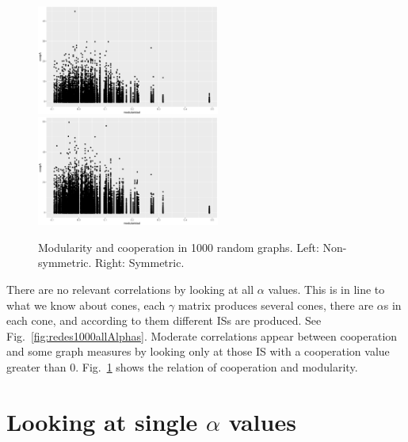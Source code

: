 \documentclass{article}
\begin{document}
\begin{figure}[htbp!]
  \centering{}
  \includegraphics[width=6cm]{img/coopMod1000AllA}\quad\quad
  \includegraphics[width=6cm]{img/coopModS1000AllA}
  \caption{Modularity and cooperation in 1000 random graphs. Left:
    Non-symmetric. Right: Symmetric.}
  \label{fig:modCoop1000RandA}
\end{figure}

There are no relevant correlations by looking at all $\alpha$
values. This is in line to what we know about cones, each $\gamma$
matrix produces several cones, there are $\alpha$s in each cone, and
according to them different ISs are produced. See
Fig.~\ref{fig:redes1000allAlphas}. Moderate correlations appear
between cooperation and some graph measures by looking only at those
IS with a cooperation value greater than
0. Fig.~\ref{fig:modCoop1000RandA} shows the relation of cooperation
and modularity. 

\section{Looking at single $\alpha$ values}
\label{sec:looking-at-single}
\end{document}
